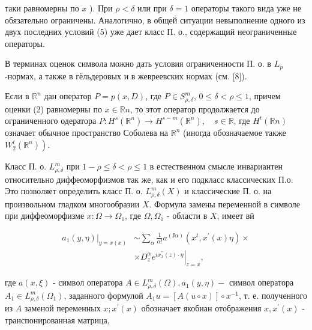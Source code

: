 \documentclass[10pt]{article}
\begin{document}
таки равномерны по $x$ ). При $\rho<\delta$ или при $\delta=1$ операторы такого вида уже не обязательно ограничены. Аналогично, в общей ситуации невыполнение одного из двух последних условий (5) уже дает класс П. о., содержащий неограниченные операторы.



В терминах оценок символа можно дать условия ограниченности П. о. в $L_{p}$-нормах, а также в гёльдеровых и в жевреевских нормах (см. [8]).



Если в $\mathbb{R}^{n}$ дан оператор $P=p(x, D)$, где $P \in S_{\rho, \delta}^{m}$, $0 \leqslant \delta<\rho \leqslant 1$, причем оценки (2) равномерны по $x \in \mathbb{R} n$, то этот оператор продолжается до ограниченного одератора $P: H^{s}\left(\mathbb{R}^{n}\right) \rightarrow H^{s-m}\left(\mathbb{R}^{n}\right), \quad s \in \mathbb{R}$, где $H^{t}(\mathbb{R} n)$ означает обычное пространство Соболева на $\mathbb{R}^{n}$ (иногда обозначаемое также $\left.W_{2}^{t}\left(\mathbb{R}^{n}\right)\right)$.



Класс П. о. $L_{\rho, \delta}^{m}$ при $1-\rho \leqslant \delta<\rho \leqslant 1$ в естественном смысле инвариантен относительно диффеоморфизмов так же, как и его подкласс классических П.о. Это позволяет определить класс П. о. $L_{\rho, \delta}^{m}(X)$ и классические П. о. на произвольном гладком многообразии $X$. Формула замены переменной в символе при диффеоморфизме $x: \Omega \rightarrow \Omega_{1}$, где $\Omega, \Omega_{1}$ - области в $X$, имеет вй



\[

\begin{aligned}

\left.a_{1}(y, \eta)\right|_{y=x(x)} & \sim \sum_{\alpha} \frac{1}{\alpha !} a^{(Ј \alpha)}\left(x^{t}, x^{\prime}(x) \eta\right) \times \\

& \times\left. D_{z}^{\alpha} e^{i x_{x}^{\prime \prime}(z) \cdot \eta}\right|_{z=x},

\end{aligned}

\]



где $a(x, \xi)$ - символ оператора $A \in L_{\rho, \delta}^{m}(\Omega), a_{1}(y, \eta)-$ символ оператора $A_{1} \in L_{\rho, \delta}^{m}\left(\Omega_{1}\right)$, заданного формулой $A_{1} u=[A(u \circ x)] \circ x^{-1}$, т. е. полученного из $A$ заменой переменных $x ; x^{\prime}(x)$ обозначает якобиан отображения $x, x^{\prime}(x)$ - транспонированная матрица,
\end{document}
